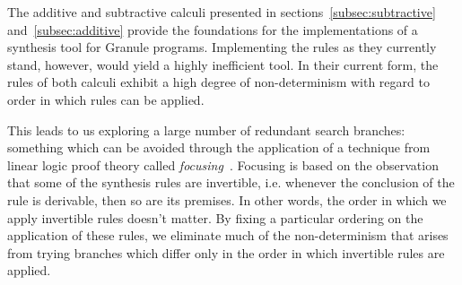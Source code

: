 The additive and subtractive calculi presented in
sections~\ref{subsec:subtractive} and~\ref{subsec:additive} provide the
foundations for the implementations of a synthesis tool for Granule programs.
Implementing the rules as they currently stand, however, would yield a highly
inefficient tool. In their current form, the rules of both calculi exhibit a
high degree of non-determinism with regard to order in which rules
can be applied. 


This leads to us exploring a large number of redundant search branches: something which can
be avoided through the application of a technique from linear logic proof theory
called \textit{focusing}~\cite{focusing}. Focusing is based on the observation
that some of the synthesis rules are invertible, i.e. whenever the conclusion of
the rule is derivable, then so are its premises. In other words, the order in
which we apply invertible rules doesn't matter. By fixing a particular ordering
on the application of these rules, we eliminate much of the non-determinism that
arises from trying branches which differ only in the order in which invertible
rules are applied. 

